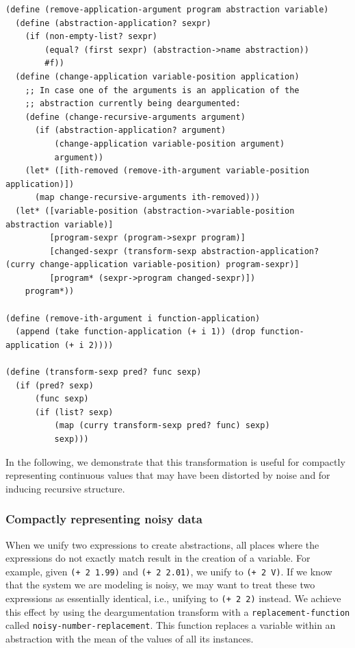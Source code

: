 \documentclass[a4paper,10pt]{article}
\begin{document}
\begin{lstlisting}[frame=trbl]
(define (remove-application-argument program abstraction variable)
  (define (abstraction-application? sexpr)
    (if (non-empty-list? sexpr)
        (equal? (first sexpr) (abstraction->name abstraction))
        #f))
  (define (change-application variable-position application)
    ;; In case one of the arguments is an application of the
    ;; abstraction currently being deargumented:
    (define (change-recursive-arguments argument)
      (if (abstraction-application? argument)
          (change-application variable-position argument)
          argument))
    (let* ([ith-removed (remove-ith-argument variable-position application)])
      (map change-recursive-arguments ith-removed)))
  (let* ([variable-position (abstraction->variable-position abstraction variable)]
         [program-sexpr (program->sexpr program)]
         [changed-sexpr (transform-sexp abstraction-application? (curry change-application variable-position) program-sexpr)]
         [program* (sexpr->program changed-sexpr)])
    program*))

(define (remove-ith-argument i function-application)
  (append (take function-application (+ i 1)) (drop function-application (+ i 2))))

(define (transform-sexp pred? func sexp)
  (if (pred? sexp)
      (func sexp)
      (if (list? sexp)
          (map (curry transform-sexp pred? func) sexp)
          sexp)))
\end{lstlisting}
In the following, we demonstrate that this transformation is useful for compactly representing continuous values that may have been distorted by noise and for inducing recursive structure.

\subsubsection{Compactly representing noisy data}

When we unify two expressions to create abstractions, all places where the expressions do not exactly match result in the creation of a variable. For example, given \texttt{(+ 2 1.99)} and \texttt{(+ 2 2.01)}, we unify to \texttt{(+ 2 V)}. If we know that the system we are modeling is noisy, we may want to treat these two expressions as essentially identical, i.e., unifying to \texttt{(+ 2 2)} instead. We achieve this effect by using the deargumentation transform with a \texttt{replacement-function} called \texttt{noisy-number-replacement}. This function replaces a variable within an abstraction with the mean of the values of all its instances.
\end{document}
